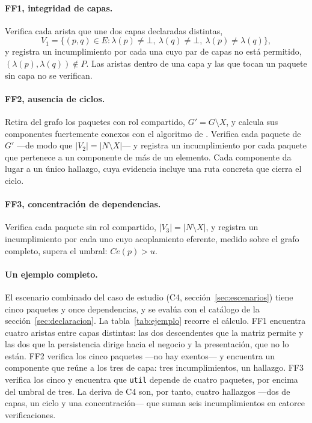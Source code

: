 \paragraph{FF1, integridad de capas.} Verifica cada arista que une dos capas declaradas distintas,
\[ V_1 = \{(p, q) \in E : \lambda(p) \neq \bot,\ \lambda(q) \neq \bot,\ \lambda(p) \neq \lambda(q)\}, \]
y registra un incumplimiento por cada una cuyo par de capas no está permitido, $(\lambda(p), \lambda(q)) \notin P$. Las aristas dentro de una capa y las que tocan un paquete sin capa no se verifican.

\paragraph{FF2, ausencia de ciclos.} Retira del grafo los paquetes con rol compartido, $G' = G \setminus X$, y calcula sus componentes fuertemente conexos con el algoritmo de \citet{Tarjan1972}. Verifica cada paquete de $G'$ ---de modo que $|V_2| = |N \setminus X|$--- y registra un incumplimiento por cada paquete que pertenece a un componente de más de un elemento. Cada componente da lugar a un único hallazgo, cuya evidencia incluye una ruta concreta que cierra el ciclo.

\paragraph{FF3, concentración de dependencias.} Verifica cada paquete sin rol compartido, $|V_3| = |N \setminus X|$, y registra un incumplimiento por cada uno cuyo acoplamiento eferente, medido sobre el grafo completo, supera el umbral: $Ce(p) > u$.

\paragraph{Un ejemplo completo.} El escenario combinado del caso de estudio (C4, sección~\ref{sec:escenarios}) tiene cinco paquetes y once dependencias, y se evalúa con el catálogo de la sección~\ref{sec:declaracion}. La tabla~\ref{tab:ejemplo} recorre el cálculo. FF1 encuentra cuatro aristas entre capas distintas: las dos descendentes que la matriz permite y las dos que la persistencia dirige hacia el negocio y la presentación, que no lo están. FF2 verifica los cinco paquetes ---no hay exentos--- y encuentra un componente que reúne a los tres de capa: tres incumplimientos, un hallazgo. FF3 verifica los cinco y encuentra que \texttt{util} depende de cuatro paquetes, por encima del umbral de tres. La deriva de C4 son, por tanto, cuatro hallazgos ---dos de capas, un ciclo y una concentración--- que suman seis incumplimientos en catorce verificaciones.

